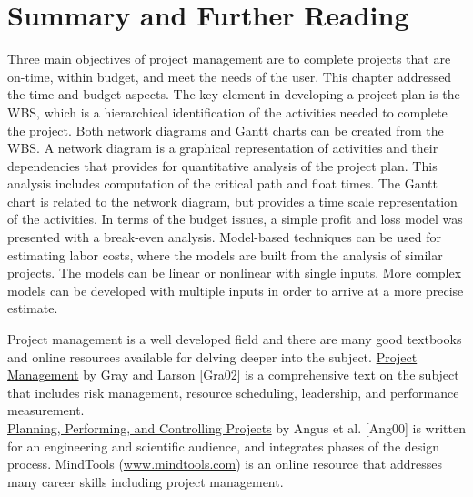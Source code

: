\section{Summary and Further Reading}
\label{section:summary-and-further-reading}

Three main objectives of project management are to complete projects
that are on-time, within budget, and meet the needs of the user. This
chapter addressed the time and budget aspects. The key element in
developing a project plan is the WBS, which is a hierarchical
identification of the activities needed to complete the project. Both
network diagrams and Gantt charts can be created from the WBS. A network
diagram is a graphical representation of activities and their
dependencies that provides for quantitative analysis of the project
plan. This analysis includes computation of the critical path and float
times. The Gantt chart is related to the network diagram, but provides a
time scale representation of the activities. In terms of the budget
issues, a simple profit and loss model was presented with a break-even
analysis. Model-based techniques can be used for estimating labor costs,
where the models are built from the analysis of similar projects. The
models can be linear or nonlinear with single inputs. More complex
models can be developed with multiple inputs in order to arrive at a
more precise estimate.

Project management is a well developed field and there are many good
textbooks and online resources available for delving deeper into the
subject. \ul{Project Management} by Gray and Larson {[}Gra02{]} is a
comprehensive text on the subject that includes risk management,
resource scheduling, leadership, and performance measurement.\\
\ul{Planning, Performing, and Controlling Projects} by Angus et al.
{[}Ang00{]} is written for an engineering and scientific audience, and
integrates phases of the design process. MindTools
(\href{http://www.mindtools.com}{www.mindtools.com}) is an online
resource that addresses many career skills including project management.
